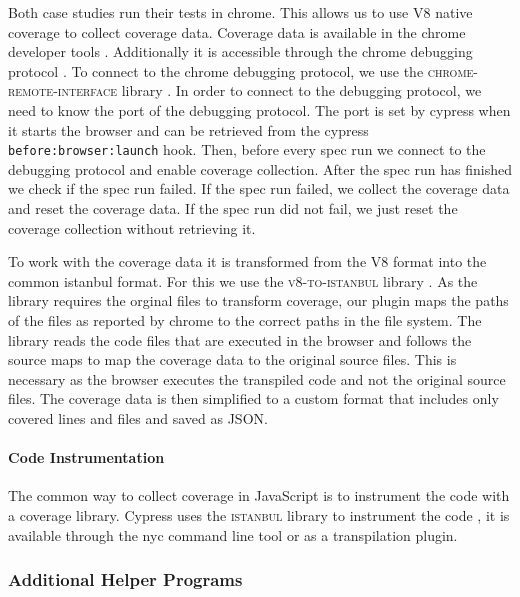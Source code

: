 Both case studies run their tests in chrome.
This allows us to use V8 native coverage to collect coverage data.
Coverage data is available in the chrome developer tools \autocite{kayce_basques_coverage_2020}.
Additionally it is accessible through the chrome debugging protocol \autocite{noauthor_chrome_nodate}.
To connect to the chrome debugging protocol, we use the \textsc{chrome-remote-interface} library \autocite{cardaci_chrome-remote-interface_2023}.
In order to connect to the debugging protocol, we need to know the port of the debugging protocol.
The port is set by cypress when it starts the browser and can be retrieved from the cypress \texttt{before:browser:launch} hook.
Then, before every spec run we connect to the debugging protocol and enable coverage collection.
After the spec run has finished we check if the spec run failed.
If the spec run failed, we collect the coverage data and reset the coverage data.
If the spec run did not fail, we just reset the coverage collection without retrieving it.

To work with the coverage data it is transformed from the V8 format into the common istanbul format.
For this we use the \textsc{v8-to-istanbul} library \autocite{noauthor_v8--istanbul_2023}.
As the library requires the orginal files to transform coverage, our plugin maps the paths of the files as reported by chrome to the correct paths in the file system.
The library reads the code files that are executed in the browser and follows the source maps to map the coverage data to the original source files.
This is necessary as the browser executes the transpiled code and not the original source files.
The coverage data is then simplified to a custom format that includes only covered lines and files and saved as JSON.

\paragraph{Code Instrumentation} The common way to collect coverage in JavaScript is to instrument the code with a coverage library.
Cypress uses the \textsc{istanbul} library to instrument the code \autocite{noauthor_code_nodate}, it is available through the nyc command line tool \autocite{noauthor_nyc_2023} or as a transpilation plugin.


\subsubsection{Additional Helper Programs}

